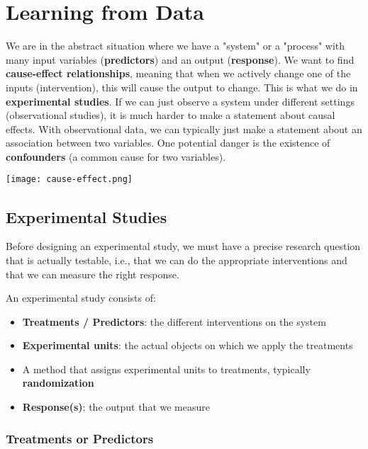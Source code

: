 \section{Learning from Data}

We are in the abstract situation where we have a "system" or a "process" with many input variables (\textbf{predictors}) and an output (\textbf{response}). We want to find \textbf{cause-effect relationships}, meaning that when we actively change one of the inputs (intervention), this will cause the output to change. This is what we do in \textbf{experimental studies}. If we can just observe a system under different settings (observational studies), it is much harder to make a statement about causal effects. With observational data, we can typically just make a statement about an association between two variables. One potential danger is the existence of \textbf{confounders} (a common cause for two variables).

\begin{center}
	\texttt{[image: cause-effect.png]}
\end{center}


\subsection{Experimental Studies}

Before designing an experimental study, we must have a precise research question that is actually testable, i.e., that we can do the appropriate interventions and that we can measure the right response. \medskip

An experimental study consists of:

\begin{itemize}
	\item \textbf{Treatments / Predictors}: the different interventions on the system
	\item \textbf{Experimental units}: the actual objects on which we apply the treatments
	\item A method that assigns experimental units to treatments, typically \textbf{randomization}
	\item \textbf{Response(s)}: the output that we measure
\end{itemize}

\subsubsection{Treatments or Predictors}

